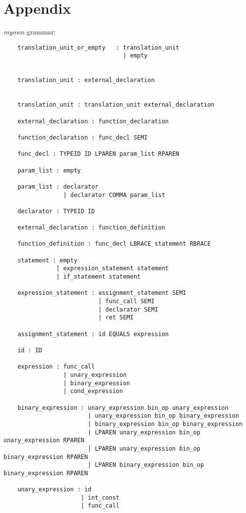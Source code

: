 \documentclass[11pt, pdftex]{article}
\begin{document}
\section{Appendix} \label{grammar}
\textit{myown } grammar:
\begin{lstlisting}
    translation_unit_or_empty   : translation_unit
                                  | empty

            
    translation_unit : external_declaration

         
    translation_unit : translation_unit external_declaration

    external_declaration : function_declaration

    function_declaration : func_decl SEMI

    func_decl : TYPEID ID LPAREN param_list RPAREN

    param_list : empty

    param_list : declarator
                 | declarator COMMA param_list

    declarator : TYPEID ID

    external_declaration : function_definition

    function_definition : func_decl LBRACE statement RBRACE

    statement : empty
               | expression_statement statement
               | if_statement statement
                          
    expression_statement : assignment_statement SEMI
                           | func_call SEMI
                           | declarator SEMI
                           | ret SEMI

    assignment_statement : id EQUALS expression
                           
    id : ID

    expression : func_call
                 | unary_expression
                 | binary_expression
                 | cond_expression

    binary_expression : unary_expression bin_op unary_expression
                        | unary_expression bin_op binary_expression
                        | binary_expression bin_op binary_expression
                        | LPAREN unary_expression bin_op unary_expression RPAREN
                        | LPAREN unary_expression bin_op binary_expression RPAREN
                        | LPAREN binary_expression bin_op binary_expression RPAREN

    unary_expression : id
                      | int_const
                      | func_call


\end{lstlisting}
\end{document}
